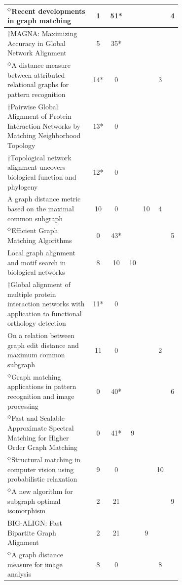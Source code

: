 \documentclass[12pt]{thesis}
\theoremstyle{plain}
\theoremstyle{definition}
\theoremstyle{remark}
\begin{document}
\begin{table}[H]
{\begin{tabular}{|L{0.7\linewidth}|c|c|c|c|c|c|}
$^\Diamond$Recent developments in graph matching  \cite{Bunke_2000} & 1 & 51* &  &  &  & 4 \\ \hline
$\dagger$MAGNA: Maximizing Accuracy in Global Network Alignment  \cite{Saraph_2014} & 5 & 35* &  &  &  &  \\ \hline
$^\Diamond$A distance measure between attributed relational graphs for pattern recognition  \cite{Sanfeliu_1983} & 14* & 0 &  &  & 3 &  \\ \hline
$\dagger$Pairwise Global Alignment of Protein Interaction Networks by Matching Neighborhood Topology  \cite{Singh_2007} & 13* & 0 &  &  &  &  \\ \hline
$\dagger$Topological network alignment uncovers biological function and phylogeny  \cite{Bunke_1998} & 12* & 0 &  &  &  &  \\ \hline
A graph distance metric based on the maximal common subgraph  \cite{Kuchaiev_2010} & 10 & 0 &  & 10 & 4 &  \\ \hline
$^\Diamond$Efficient Graph Matching Algorithms  \cite{Messmer_1995} & 0 & 43* &  &  &  & 5 \\ \hline
Local graph alignment and motif search in biological networks  \cite{Berg_2004} & 8 & 10 & 10 &  &  &  \\ \hline
$\dagger$Global alignment of multiple protein interaction networks with application to functional orthology detection  \cite{Singh_2008} & 11* & 0 &  &  &  &  \\ \hline
On a relation between graph edit distance and maximum common subgraph  \cite{Bunke_1997} & 11 & 0 &  &  & 2 &  \\ \hline
$^\Diamond$Graph matching applications in pattern recognition and image processing  \cite{Conte_2003} & 0 & 40* &  &  &  & 6 \\ \hline
$^\Diamond$Fast and Scalable Approximate Spectral Matching for Higher Order Graph Matching  \cite{Park_2014} & 0 & 41* & 9 &  &  &  \\ \hline
$^\Diamond$Structural matching in computer vision using probabilistic relaxation  \cite{Christmas_1995} & 9 & 0 &  &  & 10 &  \\ \hline
$^\Diamond$A new algorithm for subgraph optimal isomorphism  \cite{El_Sonbaty_1998} & 2 & 21 &  &  &  & 9 \\ \hline
BIG-ALIGN: Fast Bipartite Graph Alignment  \cite{Koutra_2013} & 2 & 21 &  & 9 &  &  \\ \hline
$^\Diamond$A graph distance measure for image analysis  \cite{Eshera_1984} & 8 & 0 &  &  & 8 &  \\ \hline

\end{tabular}}
\end{table}
\end{document}
